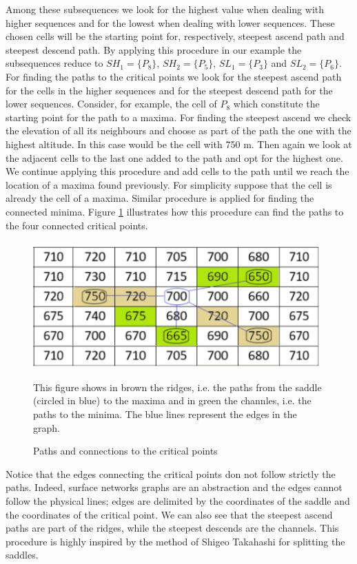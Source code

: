 Among these subsequences we look for the highest value when dealing with higher sequences and for the lowest when dealing with lower sequences. These chosen cells will be the starting point for, respectively, steepest ascend path and steepest descend path. By applying this procedure in our example the subsequences reduce to \(SH_1 = \{P_8\}\), \(SH_2 = \{P_5\}\), \(SL_1 = \{P_3\}\) and \(SL_2 = \{P_6\}\). For finding the paths to the critical points we look for the steepest ascend path for the cells in the higher sequences and for the steepest descend path for the lower sequences. Consider, for example, the cell of \(P_8\) which constitute the starting point for the path to a maxima. For finding the steepest ascend we check the elevation of all its neighbours and choose as part of the path the one with the highest altitude. In this case would be the cell with 750 m. Then again we look at the adjacent cells to the last one added to the path and opt for the highest one. We continue applying this procedure and add cells to the path until we reach the location of a maxima found previously. For simplicity suppose that the cell is already the cell of a maxima. Similar procedure is applied for finding the connected minima. Figure \ref{fig:sequences_with_paths} illustrates how this procedure can find the paths to the four connected critical points.

\begin{figure} 
\centering
\includegraphics[width=11cm]{pictures/sequences_with_paths.png}
\caption{Paths and connections to the critical points}
This figure shows in brown the ridges, i.e. the paths from the saddle (circled in blue) to the maxima and in green the channles, i.e. the paths to the minima. The blue lines represent the edges in the graph. 
\label{fig:sequences_with_paths}
\end{figure}

Notice that the edges connecting the critical points don not follow strictly the paths. Indeed, surface networks graphs are an abstraction and the edges cannot follow the physical lines; edges are delimited by the coordinates of the saddle and the coordinates of the critical point. We can also see that the steepest ascend paths are part of the ridges, while the steepest descends are the channels. This procedure is highly inspired by the method of Shigeo Takahashi for splitting the saddles. 

